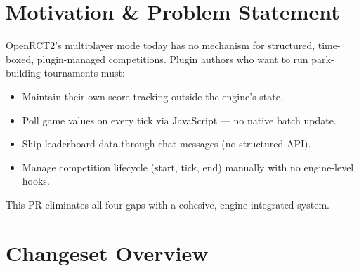 \documentclass[12pt,a4paper]{article}
\begin{document}
\section{Motivation \& Problem Statement}

OpenRCT2's multiplayer mode today has no mechanism for structured, time-boxed, plugin-managed competitions.
Plugin authors who want to run park-building tournaments must:

\begin{itemize}[noitemsep]
  \item Maintain their own score tracking outside the engine's state.
  \item Poll game values on every tick via JavaScript --- no native batch update.
  \item Ship leaderboard data through chat messages (no structured API).
  \item Manage competition lifecycle (start, tick, end) manually with no engine-level hooks.
\end{itemize}

This PR eliminates all four gaps with a cohesive, engine-integrated system.

\section{Changeset Overview}
\end{document}
